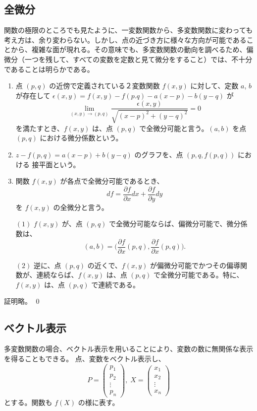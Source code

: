 \subsection{全微分}
関数の極限のところでも見たように、一変数関数から、多変数関数に変わっても考え方は、余り変わらない。しかし、点の近づき方に様々な方向が可能であることから、複雑な面が現れる。その意味でも、多変数関数の動向を調べるため、偏微分（一つを残して、すべての変数を定数と見て微分をすること）では、不十分であることは明らかである。

\begin{definition}
\begin{enumerate}
\item 点 $(p,q)$ の近傍で定義されている２変数関数 $f(x,y)$ に対して、定数 $a$, $b$ が存在して $\epsilon(x,y) = f(x,y) - f(p.q) - a(x-p) - b(y-q)$ が
$$\lim_{(x,y)\to (p,q)}\frac{\epsilon(x,y)}{\sqrt{(x-p)^2+(y-q)^2}} = 0$$
を満たすとき、$f(x,y)$ は、点 $(p,q)$ で全微分可能と言う。$(a,b)$ を点 $(p,q)$ における微分係数という。
\item $z - f(p,q) = a(x-p) + b(y-q)$ のグラフを、点 $(p,q,f(p,q))$ における 接平面という。
\item 関数 $f(x,y)$ が各点で全微分可能であるとき、
$$df = \frac{\partial f}{\partial x}dx + \frac{\partial f}{\partial y}dy$$
を $f(x,y)$ の全微分と言う。
\end{enumerate}
\end{definition}

\begin{prop} \label{prop:totalderiv}
\begin{itemize}
\item[$(1)$] $f(x,y)$ が、点 $(p,q)$ で全微分可能ならば、偏微分可能で、微分係数は、
$$(a,b) = \bigl(\frac{\partial f}{\partial x}(p,q),\frac{\partial f}{\partial x}(p,q)\bigr).$$
\item[$(2)$] 逆に、点 $(p,q)$ の近くで、$f(x,y)$ が偏微分可能でかつその偏導関数が、連続ならば、$f(x,y)$ は、点 $(p,q)$ で全微分可能である。特に、$f(x,y)$ は、点 $(p,q)$ で連続である。
\end{itemize}
\end{prop}
\proof
証明略。
\qed

\subsection{ベクトル表示}
多変数関数の場合、ベクトル表示を用いることにより、変数の数に無関係な表示を得ることもできる。
点、変数をベクトル表示し、
$$P = \left(\begin{array}{c}p_1\\p_2\\\vdots\\p_n\end{array}\right),\;X = \left(\begin{array}{c}x_1\\x_2\\\vdots\\x_n\end{array}\right)$$
とする。関数も $f(X)$ の様に表す。

